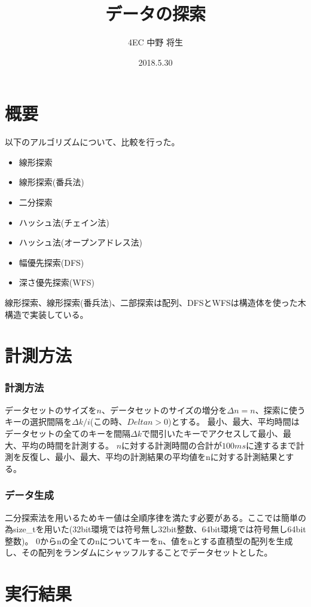 \documentclass[dvipdfmx]{jsarticle}
\author{4EC 中野 将生}
\date{2018.5.30}
\title{データの探索}
\begin{document}
	\maketitle
	\section{概要}
		以下のアルゴリズムについて、比較を行った。
		\begin{itemize}
			\item 線形探索
			\item 線形探索(番兵法)
			\item 二分探索
			\item ハッシュ法(チェイン法)
			\item ハッシュ法(オープンアドレス法)
			\item 幅優先探索(DFS)
			\item 深さ優先探索(WFS)
		\end{itemize}
		線形探索、線形探索(番兵法)、二部探索は配列、DFSとWFSは構造体を使った木構造で実装している。
	\section{計測方法}
		\subsubsection{計測方法}
			データセットのサイズを$n$、データセットのサイズの増分を$\Delta n = n$、探索に使うキーの選択間隔を$\Delta k/i$(この時、$Delta n > 0$)とする。
			最小、最大、平均時間はデータセットの全てのキーを間隔$\Delta k$で間引いたキーでアクセスして最小、最大、平均の時間を計測する。
			$n$に対する計測時間の合計が$100 ms$に達するまで計測を反復し、最小、最大、平均の計測結果の平均値をnに対する計測結果とする。
		\subsubsection{データ生成}
			二分探索法を用いるためキー値は全順序律を満たす必要がある。ここでは簡単の為size_tを用いた(32bit環境では符号無し32bit整数、64bit環境では符号無し64bit整数)。
			0からnの全てのnについてキーをn、値をnとする直積型の配列を生成し、その配列をランダムにシャッフルすることでデータセットとした。
	\section{実行結果}
\end{document}
